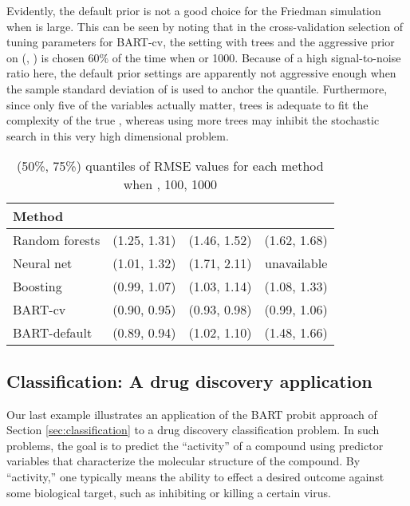 \documentclass[aoas,nameyear,dvips]{arximspdf}
\begin{document}
Evidently, the default prior is not a good choice for the Friedman simulation when  is large.
This can be seen by noting that
in the cross-validation selection of tuning parameters for BART-cv,
the setting with  trees and the aggressive prior on  (, ) is
chosen 60\% of the time when  or 1000.  Because of a high signal-to-noise ratio here,
the default  prior settings are apparently not aggressive enough
when the sample standard deviation of  is used to anchor the quantile.  Furthermore,
since only five of the variables actually matter,  trees is adequate to fit
the complexity of the true , whereas using more trees may inhibit the stochastic
search in this very high dimensional problem.


\iffalse
From a Bayesian perspective, the ``big , small '' scenario cries out for
the use of prior information.
In Bayesian variable selection for linear models, this would be expressed
directly expressed as a prior on the number of variables.
In BART, this prior information is quite naturally needed on  directly
and on the number of variable through the choice of .
\fi


\begin{table}[b]
\tablewidth=290pt
\caption{(50\%, 75\%) quantiles of RMSE values for each method when , 100, 1000}\label{tab:friedman-perf}
\begin{tabular*}{290pt}{@{\extracolsep{\fill}}lccc@{}}
\hline
\textbf{Method}         &           &         &        \\
\hline
Random forests &  (1.25, 1.31) & (1.46, 1.52) & (1.62, 1.68)  \\
Neural net     &  (1.01, 1.32) & (1.71, 2.11) &   unavailable  \\
Boosting       &  (0.99, 1.07) & (1.03, 1.14) & (1.08, 1.33)  \\
BART-cv        &  (0.90, 0.95) & (0.93, 0.98) & (0.99, 1.06)  \\
BART-default   &  (0.89, 0.94) & (1.02, 1.10) & (1.48, 1.66)\\
\hline
\end{tabular*}
\end{table}




\subsection{Classification: A drug discovery application}\label{sec:drugdisc}

Our last example illustrates an application of the BART probit approach
of Section \ref{sec:classification} to a drug discovery
classification problem.  In such problems, the goal is to predict
the ``activity'' of a compound using
predictor variables that characterize the molecular structure of the
compound.  By ``activity,'' one typically means the ability to effect
a desired outcome against some biological target, such as inhibiting or
killing a certain virus.
\end{document}
